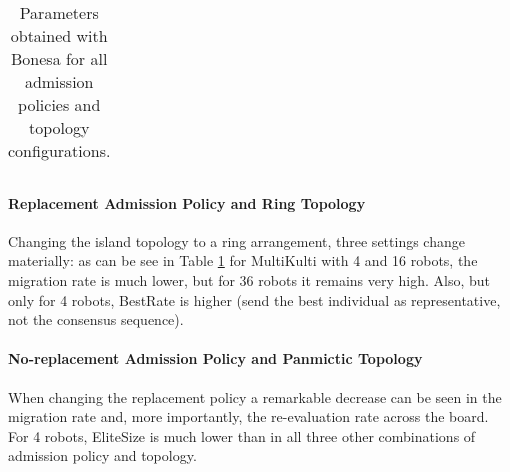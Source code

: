 \documentclass[runningheads]{llncs}
\begin{document}
\begin{table}[t!]
{\begin{tabular}{|c|c|c|c|c|	c|c|c|c|c|}
\end{tabular}
}

\caption{Parameters obtained with Bonesa for all admission policies and topology configurations.}
\label{tab:all}
\vspace{-24pt}
\end{table}


\paragraph{Replacement Admission Policy and Ring Topology}

Changing the island topology to a ring arrangement, three settings change materially: as can be see in Table \ref{tab:all} for MultiKulti with 4 and 16 robots, the migration rate is much lower, but for 36 robots it remains very high. Also, but only for 4 robots, BestRate is higher (send the best individual as representative, not the consensus sequence).


\paragraph{No-replacement Admission Policy and Panmictic Topology}

When changing the replacement policy a remarkable decrease can be seen in the migration rate and, more importantly, the re-evaluation rate across the board. 
For 4 robots, EliteSize is much lower than in all three other combinations of admission policy and topology.
\end{document}
